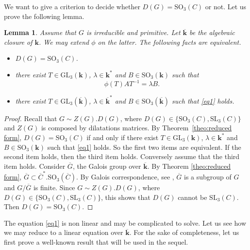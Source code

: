 \documentclass[a4paper,11pt]{amsart}
\newtheorem{lem}[thm]{Lemma}
\def\k{\mathbf{k}}
\begin{document}
We want to give a criterion to decide whether $D(G)=\mathrm{SO}_3(C)$ or not.  Let us prove the following lemma. 

 \begin{lem}\label{lem3}
Assume that $G$ is irreducible and primitive. Let  $\overline{\mathbf{k}}$ be the algebraic closure of $\k$. We may extend $\phi$ on the latter.   The following facts are equivalent. 
\begin{itemize}
\item  $D(G)=\mathrm{SO}_3(C)$.
\item there exist $T\in \mathrm{GL}_3(\k)$,  $\lambda \in \mathbf{k}^*$  and $B\in  \mathrm{SO}_3(\mathbf{k})$ such that   \begin{equation}\label{eq1}
 \phi(T)AT^{-1}=\lambda B.
 \end{equation}
\item there exist $T\in \mathrm{GL}_3(\overline{\mathbf{k}})$,  $\lambda \in \overline{\mathbf{k}}^*$  and $B\in  \mathrm{SO}_3(\overline{\mathbf{k}})$ such that  \eqref{eq1} holds. 
\end{itemize}
\end{lem}

\begin{proof}
Recall that   $G\sim Z(G). D(G)$,  where $D(G)\in \{\mathrm{SO}_3(C),\mathrm{SL}_3(C) \}$ and $Z(G)$ is composed by dilatations matrices.  By Theorem~\ref{theo:reduced form},  $D(G)=\mathrm{SO}_3(C)$ if and only if 
there exist $T\in \mathrm{GL}_3(\k)$,  $\lambda \in \mathbf{k}^*$   and $B\in  \mathrm{SO}_3(\mathbf{k})$ such that  \eqref{eq1} holds.  So the first two items are equivalent.   If the second item holds, then the third item holds.  Conversely assume that the third item holds.  
Consider $\overline{G}$,  the Galois group over $\overline{\mathbf{k}}$.  By Theorem \ref{theo:reduced form},  $\overline{G}\subset \overline{C}^*. \mathrm{SO}_3(\overline{C})$. 
 By Galois correspondence, see \cite[Chapter 1]{van2006galois},  $\overline{G}$ is a subgroup of $G$ and $G/\overline{G}$ is  finite. Since $G\sim  Z(G). D(G)$,  where $D(G)\in \{\mathrm{SO}_3(C),\mathrm{SL}_3(C) \}$, this shows that $D(G)$ cannot be $\mathrm{SL}_3(C)$.  Then $D(G)= \mathrm{SO}_3(C)$. 
\end{proof}

The equation \eqref{eq1} is non linear and may be complicated to solve. Let us see how we may reduce to a linear equation over $\overline{\mathbf{k}}$.  
For the sake of completeness, let us first prove a well-known
result that will  be used in the sequel.
 
\end{document}
